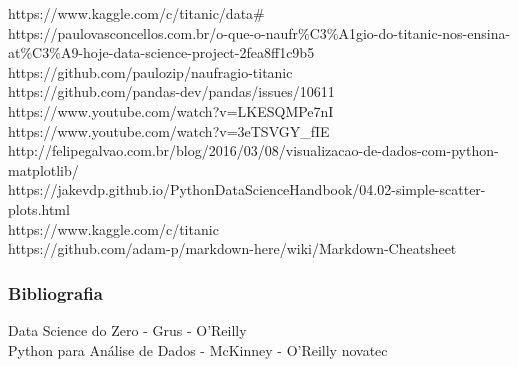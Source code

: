 \documentclass[11pt]{article}
\begin{document}
https://www.kaggle.com/c/titanic/data\#\\
https://paulovasconcellos.com.br/o-que-o-naufr\%C3\%A1gio-do-titanic-nos-ensina-at\%C3\%A9-hoje-data-science-project-2fea8ff1c9b5\\
https://github.com/paulozip/naufragio-titanic\\
https://github.com/pandas-dev/pandas/issues/10611\\
https://www.youtube.com/watch?v=LKESQMPe7nI\\
https://www.youtube.com/watch?v=3eTSVGY\_fIE\\
http://felipegalvao.com.br/blog/2016/03/08/visualizacao-de-dados-com-python-matplotlib/\\
https://jakevdp.github.io/PythonDataScienceHandbook/04.02-simple-scatter-plots.html\\
https://www.kaggle.com/c/titanic\\
https://github.com/adam-p/markdown-here/wiki/Markdown-Cheatsheet

\subsubsection{Bibliografia}\label{bibliografia}

Data Science do Zero - Grus - O'Reilly\\
Python para Análise de Dados - McKinney - O'Reilly \textbar{} novatec


    
    
    
    
\end{document}
